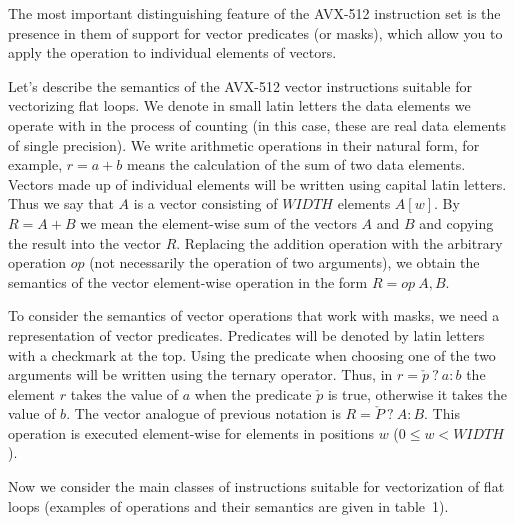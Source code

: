 \documentclass[
11pt,%
tightenlines,%
twoside,%
onecolumn,%
nofloats,%
nobibnotes,%
nofootinbib,%
superscriptaddress,%
noshowpacs,%
centertags]%
{revtex4}
\begin{document}
The most important distinguishing feature of the AVX-512 instruction set is the presence in them of support for vector predicates (or masks), which allow you to apply the operation to individual elements of vectors.

Let's describe the semantics of the AVX-512 vector instructions suitable for vectorizing flat loops.
We denote in small latin letters the data elements we operate with in the process of counting (in this case, these are real data elements of single precision).
We write arithmetic operations in their natural form, for example, $r = a + b$ means the calculation of the sum of two data elements.
Vectors made up of individual elements will be written using capital latin letters.
Thus we say that $A$ is a vector consisting of $WIDTH$ elements $A[w]$.
By $R = A + B$ we mean the element-wise sum of the vectors $A$ and $B$ and copying the result into the vector $R$.
Replacing the addition operation with the arbitrary operation $op$ (not necessarily the operation of two arguments), we obtain the semantics of the vector element-wise operation in the form $R = op \ A, B$.

To consider the semantics of vector operations that work with masks, we need a representation of vector predicates.
Predicates will be denoted by latin letters with a checkmark at the top.
Using the predicate when choosing one of the two arguments will be written using the ternary operator.
Thus, in $r = \check{p} \ ? \ a : b$ the element $r$ takes the value of $a$ when the predicate $\check{p}$ is true, otherwise it takes the value of $b$.
The vector analogue of previous notation is $R = \check{P} \ ? \ A : B$.
This operation is executed element-wise for elements in positions $w$ ($0 \le w < WIDTH$).

Now we consider the main classes of instructions suitable for vectorization of flat loops (examples of operations and their semantics are given in table~1).
\end{document}
